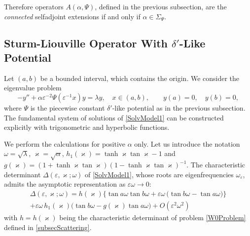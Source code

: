 \documentclass[11pt,english]{amsart}
\begin{document}
Therefore  operators $A(\alpha,\Psi)$, defined in the previous subsection, are  the \emph{connected} selfadjoint extensions if and only  if $\alpha\in \Sigma_\Psi$.

\subsection{Sturm-Liouville Operator With  $\delta'$-Like Potential}
Let $(a,b)$ be a bounded interval, which contains the origin. We consider the eigenvalue problem
\begin{equation}\label{SolvModel1}
    -y''+\alpha\varepsilon^{-2}\Psi(\varepsilon^{-1}x)y=\lambda y,\quad x\in(a,b),\qquad y(a)=0,\quad y(b)=0,
\end{equation}
where $\Psi$ is the piecewise constant $\delta'$-like potential as in the previous subsection.
The fundamental system of solutions of \eqref{SolvModel1}  can be constructed explicitly with trigonometric and  hyperbolic functions.

We  perform  the calculations for positive $\alpha$ only. Let us introduce the notation
$\omega=\sqrt{\lambda}$, $\varkappa=\sqrt{\alpha}$,
$h_1(\varkappa)=\operatorname*{tanh}\varkappa\operatorname*{tan}\varkappa-1$ and
$g(\varkappa)=(1+\operatorname*{tanh}\varkappa\operatorname*{tan}\varkappa)(1-\operatorname*{tanh}\varkappa\operatorname*{tan}\varkappa)^{-1}$.
The characteristic determinant $\Delta(\varepsilon, \varkappa;\omega)$ of \eqref{SolvModel1}, whose roots are eigenfrequencies $\omega_\varepsilon$, admits the asymptotic representation as $\varepsilon \omega\to 0$:
\begin{multline}\label{DetTeylor1}
\Delta(\varepsilon, \varkappa;\omega)= h(\varkappa)\bigl\{\operatorname*{tan} a\omega \operatorname*{tan} b\omega+\varepsilon\omega \,\bigl(\operatorname*{tan} b\omega -\operatorname*{tan} a\omega\bigr)\bigr\}\\
+\varepsilon\omega\, h_1(\varkappa)\bigl(\operatorname*{tan} b\omega-g(\varkappa)\operatorname*{tan} a\omega\bigr)
+O(\varepsilon^2\omega^2)
\end{multline}
with $h=h(\varkappa)$ being the characteristic determinant of problem \eqref{W0Problem}  defined in \ref{subsecScattering}.
\end{document}
